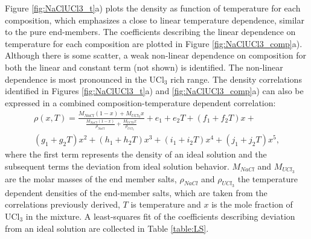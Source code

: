 \documentclass[preprint,3p,10pt,onecolumn,number,sort&compress]{elsarticle}
\begin{document}

Figure \ref{fig:NaClUCl3_t}a) plots the density as function of temperature for each composition, which emphasizes a close to linear temperature dependence, similar to the pure end-members. %
The coefficients describing the linear dependence on temperature for each composition are plotted in Figure \ref{fig:NaClUCl3_comp}a). Although there is some scatter, a weak non-linear dependence on composition for both the linear and constant term (not shown) is identified. The non-linear dependence is most pronounced in the UCl$_3$ rich range.  
The density correlations identified in Figures \ref{fig:NaClUCl3_t}a) and \ref{fig:NaClUCl3_comp}a) can also be expressed in a combined composition-temperature dependent correlation:
\begin{equation}
\begin{split}
\rho(x,T)=\frac{M_{NaCl}(1-x)+M_{UCl_3}x}{\frac{M_{NaCl}(1-x)}{\rho_{NaCl}}+\frac{M_{UCl3}x}{\rho_{UCl_3}}}+ e_1+e_2T+(f_1+f_2T)x+ \\
(g_1+g_2T)x^2+(h_1+h_2T)x^3+(i_1+i_2T)x^4+(j_1+j_2T)x^5,
\label{eq:LS}
\end{split}
\end{equation}
where the first term represents the density of an ideal solution and the subsequent terms the deviation from ideal solution behavior. $M_{NaCl}$ and $M_{UCl_3}$ are the molar masses of the end member salts, $\rho_{NaCl}$ and $\rho_{UCl_3}$ the temperature dependent densities of the end-member salts, which are taken from the correlations previously derived, $T$ is temperature and $x$ is the mole fraction of UCl$_3$ in the mixture. A least-squares fit of the coefficients describing deviation from an ideal solution are collected in Table \ref{table:LS}.
\end{document}

